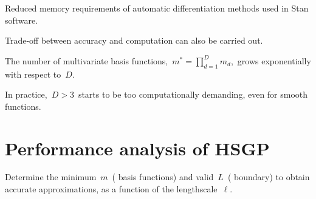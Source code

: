 \documentclass[portrait,a1,final]{a0poster} %
\let\tempone\itemize
\let\temptwo\enditemize
\renewenvironment{itemize}{\tempone\addtolength{\itemsep}{-0.3\baselineskip}}{\temptwo}
\begin{document}
\begin{minipage}{1\linewidth}
\begin{minipage}[t]{0.48\linewidth}
\begin{tcolorbox}[colframe=blue!20, colback=white, title=\scriptsize Properties of the HSGP method, colbacktitle=lightblue, coltitle=black, boxrule=0.5pt]
\begin{itemize}
\item[+] Reduced memory requirements of automatic differentiation methods used in Stan  software.

\item[+] Trade-off between accuracy and computation can also be carried out.

\item[-] The number of multivariate basis functions,\, $m^{\ast} = \prod_{d=1}^{D} m_d$,\, grows exponentially with respect to\, $D$.

\item[-] In practice,\, $D>3$\, starts to be too computationally demanding, even for smooth functions.

\end{itemize}
\end{tcolorbox}



\end{minipage}%
\hspace{0.015\linewidth} 
\begin{minipage}[t]{0.48\textwidth}
\vspace{0pt}
\setlength{\parindent}{10mm}


\vspace{0.3cm}
\section{Performance analysis of HSGP}
\vspace{-0.2cm}

\begin{itemize}\setlength\itemsep{2mm}
\item Determine the minimum\, $m$\, ({\color{navyblue} basis functions}) and valid\, $L$\, ({\color{navyblue} boundary}) to obtain accurate approximations, as a function of the {\color{navyblue} lengthscale}\, $\ell$.

%
%

\end{itemize}


\end{minipage}
\end{minipage}
\end{document}
